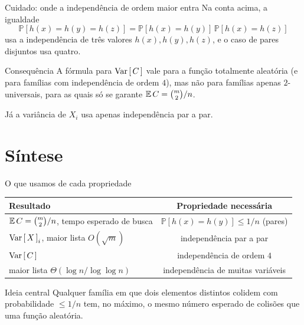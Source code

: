 \documentclass[aspectratio=169,11pt]{beamer}
\newcommand{\PP}{\mathbb P}
\begin{document}
\begin{frame}{Cuidado: onde a independência de ordem maior entra}
  Na conta acima, a igualdade
  \[
    \PP[h(x)=h(y)=h(z)]=\PP[h(x)=h(y)]\,\PP[h(x)=h(z)]
  \]
  usa a independência de \alert{três} valores $h(x),h(y),h(z)$, e o caso de
  pares disjuntos usa \alert{quatro}.
  \pause
  \begin{alertblock}{Consequência}
    A fórmula para $\Var C$ vale para a função totalmente aleatória (e para
    famílias com independência de ordem $4$), mas \alert{não} para famílias
    apenas $2$-universais, para as quais só se garante $\mathbb{E}\,C=\binom m2/n$.
  \end{alertblock}
  \vspace{0.3em}
  Já a variância de $X_i$ usa apenas independência par a par.
\end{frame}

\section{Síntese}

\begin{frame}{O que usamos de cada propriedade}
  \begin{center}
  \renewcommand{\arraystretch}{1.3}
  \begin{tabular}{lc}
    \textbf{Resultado} & \textbf{Propriedade necessária} \\\hline
    $\mathbb{E}\,C=\binom m2/n$, tempo esperado de busca & $\PP[h(x)=h(y)]\le1/n$ (pares) \\
    $\Var X_i$, maior lista $O(\sqrt m)$ & independência par a par \\
    $\Var C$ & independência de ordem $4$ \\
    maior lista $\Theta(\log n/\log\log n)$ & independência de muitas variáveis
  \end{tabular}
  \end{center}
  \pause
  \begin{block}{Ideia central}
    Qualquer família em que dois elementos distintos colidem com probabilidade
    $\le1/n$ tem, no máximo, o mesmo número esperado de colisões que uma
    função aleatória.
  \end{block}
\end{frame}
\end{document}
